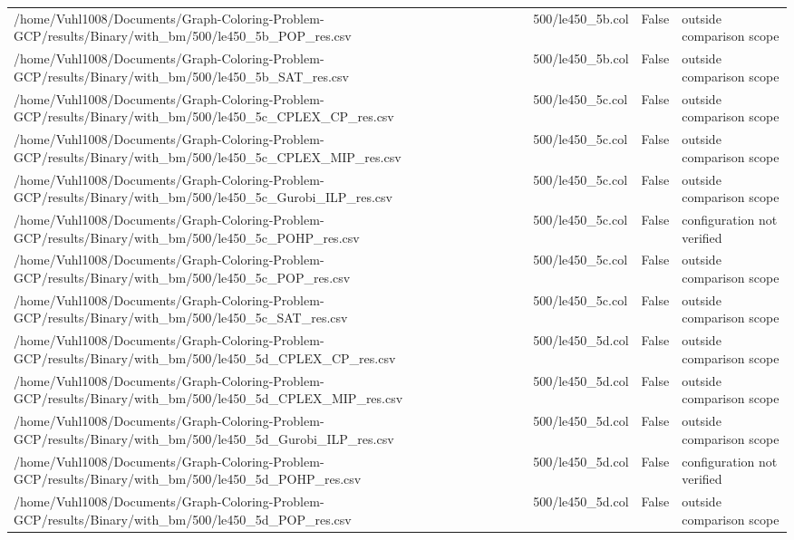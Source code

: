 \begin{table}[htbp]
\begin{tabular}{llll}
/home/Vuhl1008/Documents/Graph-Coloring-Problem-GCP/results/Binary/with\_bm/500/le450\_5b\_POP\_res.csv & 500/le450\_5b.col & False & outside comparison scope \\
/home/Vuhl1008/Documents/Graph-Coloring-Problem-GCP/results/Binary/with\_bm/500/le450\_5b\_SAT\_res.csv & 500/le450\_5b.col & False & outside comparison scope \\
/home/Vuhl1008/Documents/Graph-Coloring-Problem-GCP/results/Binary/with\_bm/500/le450\_5c\_CPLEX\_CP\_res.csv & 500/le450\_5c.col & False & outside comparison scope \\
/home/Vuhl1008/Documents/Graph-Coloring-Problem-GCP/results/Binary/with\_bm/500/le450\_5c\_CPLEX\_MIP\_res.csv & 500/le450\_5c.col & False & outside comparison scope \\
/home/Vuhl1008/Documents/Graph-Coloring-Problem-GCP/results/Binary/with\_bm/500/le450\_5c\_Gurobi\_ILP\_res.csv & 500/le450\_5c.col & False & outside comparison scope \\
/home/Vuhl1008/Documents/Graph-Coloring-Problem-GCP/results/Binary/with\_bm/500/le450\_5c\_POHP\_res.csv & 500/le450\_5c.col & False & configuration not verified \\
/home/Vuhl1008/Documents/Graph-Coloring-Problem-GCP/results/Binary/with\_bm/500/le450\_5c\_POP\_res.csv & 500/le450\_5c.col & False & outside comparison scope \\
/home/Vuhl1008/Documents/Graph-Coloring-Problem-GCP/results/Binary/with\_bm/500/le450\_5c\_SAT\_res.csv & 500/le450\_5c.col & False & outside comparison scope \\
/home/Vuhl1008/Documents/Graph-Coloring-Problem-GCP/results/Binary/with\_bm/500/le450\_5d\_CPLEX\_CP\_res.csv & 500/le450\_5d.col & False & outside comparison scope \\
/home/Vuhl1008/Documents/Graph-Coloring-Problem-GCP/results/Binary/with\_bm/500/le450\_5d\_CPLEX\_MIP\_res.csv & 500/le450\_5d.col & False & outside comparison scope \\
/home/Vuhl1008/Documents/Graph-Coloring-Problem-GCP/results/Binary/with\_bm/500/le450\_5d\_Gurobi\_ILP\_res.csv & 500/le450\_5d.col & False & outside comparison scope \\
/home/Vuhl1008/Documents/Graph-Coloring-Problem-GCP/results/Binary/with\_bm/500/le450\_5d\_POHP\_res.csv & 500/le450\_5d.col & False & configuration not verified \\
/home/Vuhl1008/Documents/Graph-Coloring-Problem-GCP/results/Binary/with\_bm/500/le450\_5d\_POP\_res.csv & 500/le450\_5d.col & False & outside comparison scope \\

\end{tabular}
\end{table}

